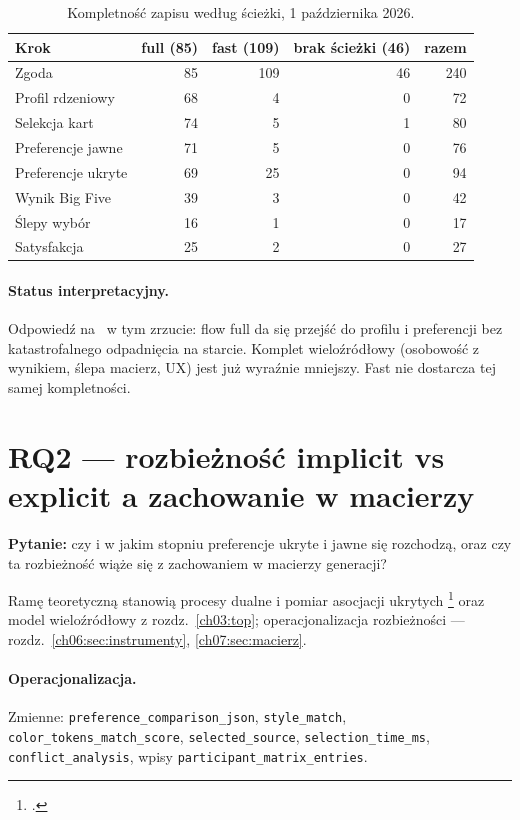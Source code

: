 \begin{table}[htbp]
  \centering
  \small
  \caption{Kompletność zapisu według ścieżki, 1 października 2026.}
  \label{tab:ch08:completeness}
  \begin{tabular}{lrrrr}
    \toprule
    Krok & full (85) & fast (109) & brak ścieżki (46) & razem \\
    \midrule
    Zgoda & 85 & 109 & 46 & 240 \\
    Profil rdzeniowy & 68 & 4 & 0 & 72 \\
    Selekcja kart & 74 & 5 & 1 & 80 \\
    Preferencje jawne & 71 & 5 & 0 & 76 \\
    Preferencje ukryte & 69 & 25 & 0 & 94 \\
    Wynik Big Five & 39 & 3 & 0 & 42 \\
    Ślepy wybór & 16 & 1 & 0 & 17 \\
    Satysfakcja & 25 & 2 & 0 & 27 \\
    \bottomrule
  \end{tabular}
\end{table}

\paragraph{Status interpretacyjny.}
Odpowiedź na~ w tym zrzucie: flow full da się przejść do profilu i preferencji bez katastrofalnego odpadnięcia na starcie. Komplet wieloźródłowy (osobowość z wynikiem, ślepa macierz, UX) jest już wyraźnie mniejszy. Fast nie dostarcza tej samej kompletności.

\section{RQ2 --- rozbieżność implicit vs explicit a zachowanie w macierzy}
\label{ch08:sec:rq2}

\textbf{Pytanie:} czy i w jakim stopniu preferencje ukryte i jawne się rozchodzą, oraz czy ta rozbieżność wiąże się z zachowaniem w macierzy generacji?

Ramę teoretyczną stanowią procesy dualne i pomiar asocjacji ukrytych \footcite{kahneman2011thinking,greenwald1998iat} oraz model wieloźródłowy z rozdz.~\ref{ch03:top}; operacjonalizacja rozbieżności --- rozdz.~\ref{ch06:sec:instrumenty}, \ref{ch07:sec:macierz}.

\paragraph{Operacjonalizacja.}
{\sloppy Zmienne: \texttt{preference\_comparison\_json}, \texttt{style\_match}, \allowbreak\texttt{color\_tokens\_match\_score}, \texttt{selected\_source}, \texttt{selection\_time\_ms}, \texttt{conflict\_analysis}, wpisy \allowbreak\texttt{participant\_matrix\_entries}.\par}

